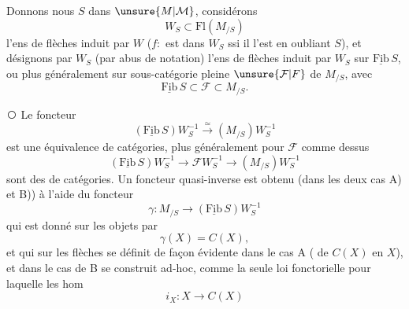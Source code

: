 Donnons nous $S$ dans $\unsure{M|\mathcal M}$, considérons
\[
W_S\subset\mathrm{Fl}(M_{/S})
\]
l'ens de flèches induit par $W$ ($f:$
est dans $W_S$ ssi il l'est en oubliant $S$), et désignons par $W_S$ (par abus de notation) l'ens de flèches induit par $W_S$ sur $\underline{\mathrm{Fib}}\,S$, ou plus généralement sur  sous-catégorie pleine $\unsure{\mathcal F|F}$ de $M_{/S}$, avec
\[
\underline{\mathrm{Fib}}\,S\subset\mathcal F\subset M_{/S}.
\]

\textcircled{}  Le foncteur
\[
(\underline{\mathrm{Fib}}\,S)W_S^{-1}\xrightarrow{\simeq}(M_{/S})W_S^{-1}\tag*{$(*)$}
\]
 est une équivalence de catégories, plus généralement pour  $\mathcal F$ comme dessus
\[
(\underline{\mathrm{Fib}}\,S)W_S^{-1}\longrightarrow\mathcal F W_S^{-1}\longrightarrow(M_{/S})W_S^{-1}
\]
sont des  de catégories. Un foncteur quasi-inverse est obtenu (dans les deux cas A) et B)) à l'aide du foncteur
\[
\gamma:M_{/S}\longrightarrow(\underline{\mathrm{Fib}}\,S)W_S^{-1}
\]
qui est donné sur les objets par
\[
\gamma(X)=C(X),
\]
et qui sur les flèches se définit de façon évidente dans le cas A ( de $C(X)$ en $X$), et dans le cas de B se construit ad-hoc, comme la seule loi fonctorielle pour laquelle les hom
\[
i_X:X\longrightarrow C(X)
\]
